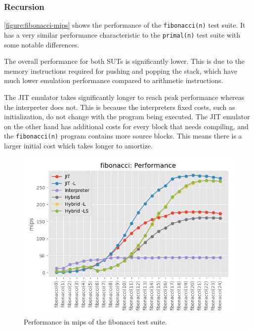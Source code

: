 \subsubsection{Recursion}
\label{section:perf-recursion}


\autoref{figure:fibonacci-mips} shows the performance of the \texttt{fibonacci(n)} test suite. It has a very similar performance characteristic to the \texttt{primal(n)} test suite with some notable differences.

The overall performance for both SUTs is significantly lower. This is due to the memory instructions required for pushing and popping the stack, which have much lower emulation performance compared to arithmetic instructions.

The JIT emulator takes significantly longer to reach peak performance whereas the interpreter does not. This is because the interpreters fixed costs, such as initialization, do not change with the program being executed. The JIT emulator on the other hand has additional costs for every block that needs compiling, and the \texttt{fibonacci(n)} program contains more source blocks. This means there is a larger initial cost which takes longer to amortize.

\begin{figure}[H]
    \centering
    \includegraphics[scale=0.75]{output/graphs/tests/all/fibonacci/mips.png}
    \caption{Performance in mips of the fibonacci test suite.}
    \label{figure:fibonacci-mips}
\end{figure}

